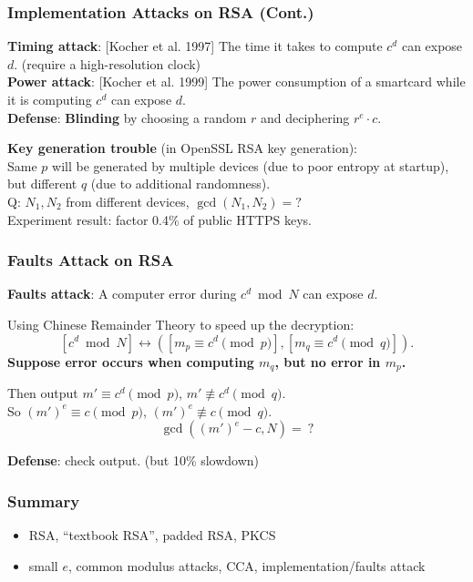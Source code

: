 \begin{frame}\frametitle{Implementation Attacks on RSA (Cont.) }
\textbf{Timing attack}: [Kocher et al. 1997] 
The time it takes to compute $c^d$ can expose $d$. (require a high-resolution clock)\\
\textbf{Power attack}: [Kocher et al. 1999]
The power consumption of a smartcard while it is computing $c^d$ can expose $d$.\\
\textbf{Defense}: \textbf{Blinding} by choosing a random $r$ and deciphering $r^{e}\cdot c$. 
\newline

\textbf{Key generation trouble} (in OpenSSL RSA key generation):\\
Same $p$ will be generated by multiple devices (due to poor entropy at startup), but different $q$ (due to additional randomness).\\
\alert{Q: $N_1,N_2$ from different devices, $\gcd(N_1,N_2) = ?$}\\
Experiment result: factor 0.4\% of public HTTPS keys.
\end{frame}
\begin{frame}\frametitle{Faults Attack on RSA}
\textbf{Faults attack}:
A computer error during $c^d\bmod N$ can expose $d$.\newline

Using Chinese Remainder Theory to speed up the decryption:
\[ [c^d \bmod N] \leftrightarrow ([m_p \equiv c^d \pmod p],[m_q \equiv c^d \pmod q]).\]
\textbf{Suppose error occurs when computing $m_q$, but no error in $m_p$.}\newline

Then output $m' \equiv c^d \pmod p$, $m' \not \equiv c^d \pmod q$.\\
So $(m')^e \equiv c \pmod p$, $(m')^e \not \equiv c \pmod q$.\\
\alert{\[\gcd((m')^e-c, N)=\ ?\]}

\textbf{Defense}: check output. (but 10\% slowdown)
\end{frame}
\begin{frame}\frametitle{Summary}
\begin{itemize}
\item RSA, ``textbook RSA'', padded RSA, PKCS
\item small $e$, common modulus attacks, CCA, implementation/faults attack
\end{itemize}
\end{frame}


